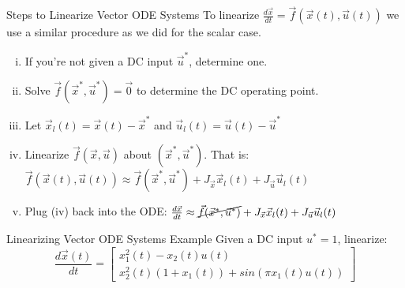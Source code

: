 \documentclass{beamer}
\begin{document}
	\begin{frame}{Steps to Linearize Vector ODE Systems}
	To linearize $\frac{d\vec{x}}{dt} = \vec{f}(\vec{x}(t), \vec{u}(t))$ we use a similar procedure as we did for the scalar case. \pause 
	\begin{enumerate}[(i)]
	    \item If you're not given a DC input $\vec{u}^*$, determine one. \pause \\
	    \item Solve $\vec{f}(\vec{x}^*, \vec{u}^*) = \vec{0}$ to determine the DC operating point. \pause \\
	    \item Let $\vec{x}_l(t) = \vec{x}(t) - \vec{x}^*$ and $\vec{u}_l(t) = \vec{u}(t) - \vec{u}^*$ \pause \\
	    \item Linearize $\vec{f}(\vec{x}, \vec{u})$ about $(\vec{x}^*, \vec{u}^*)$. That is: $\vec{f}(\vec{x}(t), \vec{u}(t)) \approx \vec{f}(\vec{x}^*, \vec{u}^*) + J_{\vec{x}}\vec{x}_l(t) + J_{\vec{u}}\vec{u}_l(t)$ \pause \\
	    \item Plug (iv) back into the ODE: $\frac{d\vec{x}}{dt} \approx \cancel{\vec{f}(\vec{x}^*, \vec{u}^*)} + J_{\vec{x}}\vec{x}_l(t) + J_{\vec{u}}\vec{u}_l(t)$
	\end{enumerate}

	\end{frame}

	\begin{frame}{Linearizing Vector ODE Systems Example}
	    Given a DC input $u^* = 1$, linearize: 
	    \[
	    \frac{d\vec{x}(t)}{dt} = \begin{bmatrix}
	    x_1^2(t) - x_2(t)u(t)\\
	    x_2^2(t)(1 + x_1(t)) + sin(\pi x_1(t)u(t))
	    \end{bmatrix}
	    \]
	    
	\end{frame}
\end{document}
